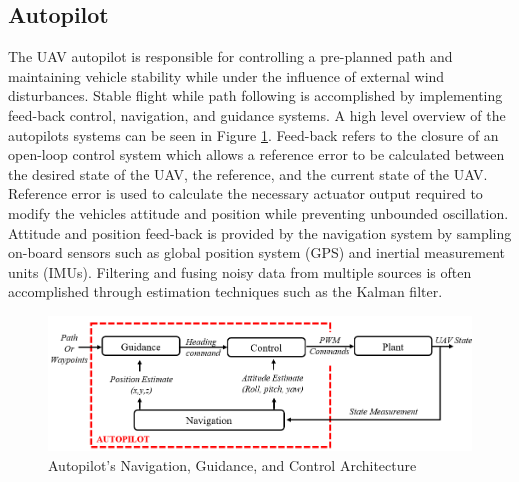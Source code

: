 \documentclass[numbered,pdftex]{ohio-etd}
\begin{document}
\subsection{Autopilot}
The UAV autopilot is responsible for controlling a pre-planned path and maintaining vehicle stability while under the influence of external wind disturbances. Stable flight while path following is accomplished by implementing feed-back control, navigation, and guidance systems. A high level overview of the autopilots systems can be seen in Figure \ref{fig:autopilotloops}. Feed-back refers to the closure of an open-loop control system which allows a reference error to be calculated between the desired state of the UAV, the reference, and the current state of the UAV. Reference error is used to calculate the necessary actuator output required to modify the vehicles attitude and position while preventing unbounded oscillation. Attitude and position feed-back is provided by the navigation system by sampling on-board sensors such as global position system (GPS) and inertial measurement units (IMUs). Filtering and fusing noisy data from multiple sources is often accomplished through estimation techniques such as the Kalman filter. \\



%
%
%




\begin{figure}
	\centering
	\includegraphics[width=15cm]{PaperFigures/autopilotLoops2}
	\caption{Autopilot's Navigation, Guidance, and Control Architecture}
	\label{fig:autopilotloops}
\end{figure}
\end{document}
